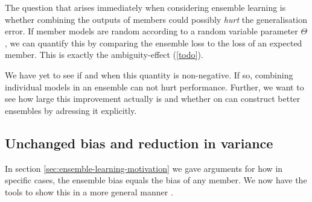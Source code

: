 \documentclass[../main.tex]{subfiles}
\begin{document}
The question that arises immediately when considering ensemble learning is whether combining the outputs of members could possibly \textit{hurt} the generalisation error. If member models are random according to a random variable parameter $\Theta$, we can quantify this by comparing the ensemble loss to the loss of an expected member. This is exactly the ambiguity-effect (\ref{todo}).


We have yet to see if and when this quantity is non-negative. If so, combining individual models in an ensemble can not hurt performance. Further, we want to see how large this improvement actually is and whether on can construct better ensembles by adressing it explicitly.

\subsection{Unchanged bias and reduction in variance}
\label{sec:unchanged-bias}

In section \ref{sec:ensemble-learning-motivation} we gave arguments for how in specific cases, the ensemble bias equals the bias of any member. We now have the tools to show this in a more general manner \cite{wood23}.
\end{document}
